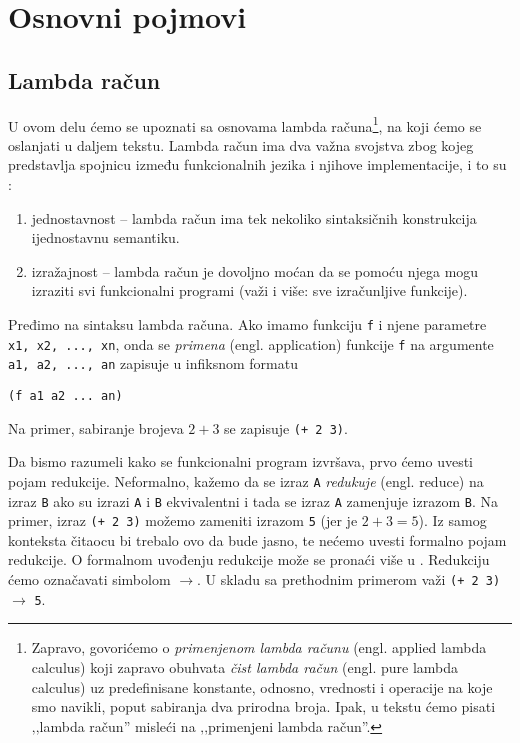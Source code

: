 \section{Osnovni pojmovi}
\label{sec:osnovni pojmovi}

\subsection{Lambda račun}
\label{subsec:lambda racun}

U ovom delu ćemo se upoznati sa osnovama lambda računa\footnote{Zapravo, govorićemo o \textit{primenjenom lambda računu} (engl. applied lambda calculus) koji zapravo obuhvata \textit{čist lambda račun} (engl. pure lambda calculus) uz predefinisane konstante, odnosno, vrednosti i operacije na koje smo navikli, poput sabiranja dva prirodna broja. Ipak, u tekstu ćemo pisati ‚‚lambda račun'' misleći na ‚‚primenjeni lambda račun''.}, na koji ćemo se oslanjati u daljem tekstu. Lambda račun ima dva važna svojstva zbog kojeg predstavlja spojnicu između funkcionalnih jezika i njihove implementacije, i to su \cite{the-implementation-of-functional-programming-languages}:
\begin{enumerate}
	\item jednostavnost -- lambda račun ima tek nekoliko sintaksičnih konstrukcija ijednostavnu semantiku.
	\item izražajnost -- lambda račun je dovoljno moćan da se pomoću njega mogu izraziti svi funkcionalni programi (važi i više: sve izračunljive funkcije).
\end{enumerate}

Pređimo na sintaksu lambda računa. Ako imamo funkciju \verb|f| i njene parametre \verb|x1, x2, ..., xn|, onda se \textit{primena} (engl. application) funkcije \verb|f| na argumente \verb|a1, a2, ..., an| zapisuje u infiksnom formatu
\begin{center}
	\verb|(f a1 a2 ... an)|
\end{center}
Na primer, sabiranje brojeva $2+3$ se zapisuje \verb|(+ 2 3)|.

Da bismo razumeli kako se funkcionalni program izvršava, prvo ćemo uvesti pojam redukcije. Neformalno, kažemo da se izraz \verb|A| \textit{redukuje} (engl. reduce) na izraz \verb|B| ako su izrazi \verb|A| i \verb|B| ekvivalentni i tada se izraz \verb|A| zamenjuje izrazom \verb|B|. Na primer, izraz \verb|(+ 2 3)| možemo zameniti izrazom \verb|5| (jer je $2+3=5$). Iz samog konteksta čitaocu bi trebalo ovo da bude jasno, te nećemo uvesti formalno pojam redukcije. O formalnom uvođenju redukcije može se pronaći više u \cite{foundations-of-functional-programming}. Redukciju ćemo označavati simbolom $\rightarrow$. U skladu sa prethodnim primerom važi \verb|(+ 2 3)| $\rightarrow$ \verb|5|.

